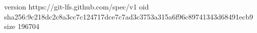version https://git-lfs.github.com/spec/v1
oid sha256:9c218dc2c8a3cc7c124717dce7c7ad3c3753a315a6f96c89741343d68491ecb9
size 196704
